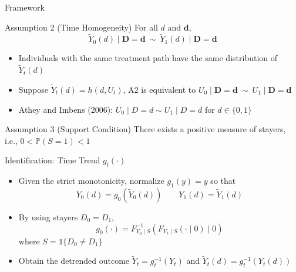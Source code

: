 \documentclass[aspectratio=1610, 9pt]{beamer}
\begin{document}
\begin{frame}{Framework}
\begin{block}{Assumption 2 (Time Homogeneity)}\label{ass:stationary}
  For all $d$ and $\mathbf{d}$,
    $$\tilde{Y}_0(d)\mid \mathbf{D}=\mathbf{d} \ \sim \  \tilde{Y}_{1}(d)\mid \mathbf{D}=\mathbf{d} $$

\end{block}
\vspace{0.5cm}
\begin{itemize}
    \item Individuals with the same treatment path have the same distribution of $\tilde{Y}_t(d)$
    \item Suppose $\tilde{Y}_t(d)=h(d,U_t)$, A2 is equivalent to $U_0\mid \mathbf{D}=\mathbf{d} \ \sim \ U_1\mid \mathbf{D}=\mathbf{d}$ 
    \item Athey and Imbens (2006): $U_{0}\mid D=d\sim U_{1}\mid D=d$ for $d\in\{0,1\}$
\end{itemize}
\vspace{0.2cm}
\begin{block}{Assumption 3 (Support Condition)}
    There exists a positive measure of stayers, i.e., $0<\mathbb{P}(S=1)<1$
\end{block}

\end{frame}

\begin{frame}{Identification: Time Trend $g_{t}(\cdot)$}
    \begin{itemize}
        \item Given the strict monotonicity, normalize $g_{1}(y)=y$ so that
           $$Y_{0}(d)=g_{0}(\tilde{Y}_{0}(d))\qquad  Y_{1}(d)=\tilde{Y}_{1}(d)$$
        \item By using stayers {$D_{0}=D_{1}$},
        $$g_{0}(\cdot)=F_{Y_{0}\mid S}^{-1}\left(F_{Y_{1}\mid S}(\cdot\mid 0 )\mid 0\right)$$ where $S=\mathds{1}\{D_{0}\neq D_{1}\}$ 
        
        \item Obtain the detrended outcome $\tilde{Y}_{t}=g_{t}^{-1}(Y_{t})$ and $\tilde{Y}_{t}(d)=g_{t}^{-1}(Y_{t}(d))$ 
    \end{itemize}

\end{frame}
\end{document}
